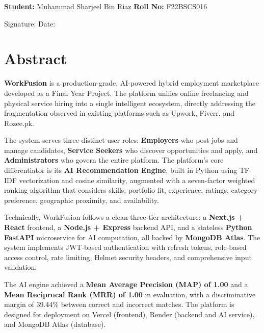 \documentclass[12pt,a4paper,oneside]{report}
\begin{document}
\vspace{1.5cm}
\noindent\textbf{Student:} Muhammad Sharjeel Bin Riaz \hfill \textbf{Roll No:} F22BSCS016

\vspace{2cm}
\noindent Signature: \underline{\hspace{5cm}} \hfill Date: \underline{\hspace{3cm}}

\chapter*{Abstract}
\textbf{WorkFusion} is a production-grade, AI-powered hybrid employment marketplace developed as a Final Year Project. The platform unifies online freelancing and physical service hiring into a single intelligent ecosystem, directly addressing the fragmentation observed in existing platforms such as Upwork, Fiverr, and Rozee.pk.

The system serves three distinct user roles: \textbf{Employers} who post jobs and manage candidates, \textbf{Service Seekers} who discover opportunities and apply, and \textbf{Administrators} who govern the entire platform. The platform's core differentiator is its \textbf{AI Recommendation Engine}, built in Python using TF-IDF vectorization and cosine similarity, augmented with a seven-factor weighted ranking algorithm that considers skills, portfolio fit, experience, ratings, category preference, geographic proximity, and availability.

Technically, WorkFusion follows a clean three-tier architecture: a \textbf{Next.js + React} frontend, a \textbf{Node.js + Express} backend API, and a stateless \textbf{Python FastAPI} microservice for AI computation, all backed by \textbf{MongoDB Atlas}. The system implements JWT-based authentication with refresh tokens, role-based access control, rate limiting, Helmet security headers, and comprehensive input validation.

The AI engine achieved a \textbf{Mean Average Precision (MAP) of 1.00} and a \textbf{Mean Reciprocal Rank (MRR) of 1.00} in evaluation, with a discriminative margin of 39.44\% between correct and incorrect matches. The platform is designed for deployment on Vercel (frontend), Render (backend and AI service), and MongoDB Atlas (database).
\end{document}

